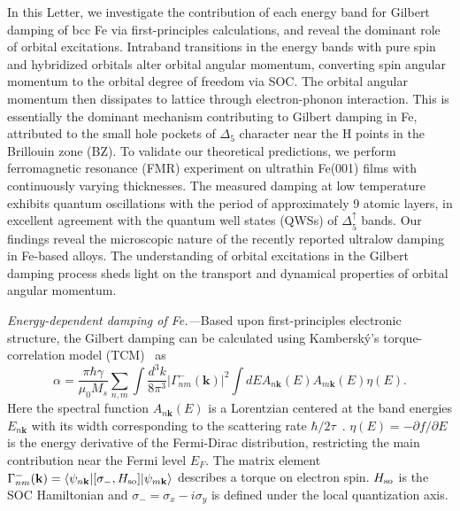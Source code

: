 \documentclass[prl,aps,twocolumn,showpacs,citeautoscript,reprint,superscriptaddress]{revtex4-1}
\begin{document}
In this Letter, we investigate the contribution of each energy band for Gilbert damping of bcc Fe via first-principles calculations, and reveal the dominant role of orbital excitations. Intraband transitions in the energy bands with pure spin and hybridized orbitals alter orbital angular momentum, converting spin angular momentum to the orbital degree of freedom via SOC. The orbital angular momentum then dissipates to lattice through electron-phonon interaction. This is essentially the dominant mechanism contributing to Gilbert damping in Fe, attributed to the small hole pockets of $\Delta_5$ character near the H points in the Brillouin zone (BZ). To validate our theoretical predictions, we perform ferromagnetic resonance (FMR) experiment on ultrathin Fe(001) films with continuously varying thicknesses. The measured damping at low temperature exhibits quantum oscillations with the period of approximately 9 atomic layers, in excellent agreement with the quantum well states (QWSs) of $\Delta_5^\uparrow$ bands. Our findings reveal the microscopic nature of the recently reported ultralow damping in Fe-based alloys. The understanding of orbital excitations in the Gilbert damping process sheds light on the transport and dynamical properties of orbital angular momentum.

{\it\color{red}Energy-dependent damping of Fe.---}Based upon first-principles electronic structure, the Gilbert damping can be calculated using Kambersk{\'y}'s torque-correlation model (TCM)~\cite{Kambsersky:CJP76,Gilmore:PRL07,Gilmore:JAP08} as
\begin{equation}
\alpha=\frac{\pi\hbar\gamma}{\mu_{0}M_s}\sum_{n,m}\int\frac{d^3k}{8\pi^3}\vert\Gamma_{nm}^{-}(\mathbf k)\vert^2\int dEA_{n\mathbf{k}}(E)A_{m\mathbf{k}}(E)\eta(E).\label{eq:tcm}
\end{equation}
Here the spectral function $A_{n\mathbf{k}}(E)$ is a Lorentzian centered at the band energies $E_{n\mathbf k}$ with its width corresponding to the scattering rate $\hbar/2\tau$~\cite{Gilmore:JAP08}. $\eta(E)=-\partial f/\partial E$ is the energy derivative of the Fermi-Dirac distribution, restricting the main contribution near the Fermi level $E_F$. The matrix element $\Gamma_{nm}^{-}(\mathbf k)=\langle\psi_{n\mathbf k}\vert[\sigma_-,H_{\rm so}]\vert\psi_{m\mathbf k}\rangle$ describes a torque on electron spin. $H_{\rm so}$ is the SOC Hamiltonian and $\sigma_-=\sigma_x-i\sigma_y$ is defined under the local quantization axis. 
\end{document}
